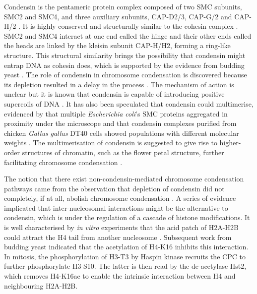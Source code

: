 Condensin is the pentameric protein complex composed of two SMC subunits, SMC2 and SMC4, and three auxiliary subunits, CAP-D2/3, CAP-G/2 and CAP-H/2 \citep{Hirano2012Condensins:Functions, Kalitsis2017CondensinGenome}. It is highly conserved and structurally similar to the cohesin complex \citep{Davidson2021GenomeComplexes}. SMC2 and SMC4 interact at one end called the hinge and their other ends called the heads are linked by the kleisin subunit CAP-H/H2, forming a ring-like structure. This structural similarity brings the possibility that condensin might entrap DNA as cohesin does, which is supported by the evidence from budding yeast \citep{Cuylen2011CondensinLinks, Ganji2018Real-timeCondensin}. The role of condensin in chromosome condensation is discovered because its depletion resulted in a delay in the process \citep{Hagstrom2002C.Meiosis, Kaitna2002TheMeiosis, Hudson2003CondensinChromosomes}. The mechanism of action is unclear but it is known that condensin is capable of introducing positive supercoils of DNA \citep{Hirano2012Condensins:Functions}. It has also been speculated that condensin could multimerise, evidenced by that multiple \textit{Escherichia coli}'s SMC proteins aggregated in proximity under the microscope \citep{Badrinarayanan2012InProteins} and that condensin complexes purified from chicken \textit{Gallus gallus} DT40 cells showed populations with different molecular weights \citep{Barysz2015Three-dimensionalModelling}. The multimerisation of condensin is suggested to give rise to higher-order structures of chromatin, such as the flower petal structure, further facilitating chromosome condensation \citep{Piskadlo2016NovelCondensation, Kalitsis2017CondensinGenome}. 

The notion that there exist non-condensin-mediated chromosome condensation pathways came from the observation that depletion of condensin did not completely, if at all, abolish chromosome condensation \citep{Hudson1998CentromereWeights, Gerlich2006CondensinCells, Vagnarelli2006CondensinMitosisb, Kireeva2004VisualizationStructure, Hagstrom2002C.Meiosis}. A series of evidence implicated that inter-nucleosomal interactions might be the alternative to condensin, which is under the regulation of a cascade of histone modifications. It is well characterised by \textit{in vitro} experiments that the acid patch of H2A-H2B could attract the H4 tail from another nucleosome \citep{Robinson200830nmEviction, Shogren-Knaak2006HistoneInteractions}. Subsequent work from budding yeast \citep{Wilkins2014AMitosis, Kruitwagen2015a} indicated that the acetylation of H4-K16 inhibits this interaction. In mitosis, the phosphorylation of H3-T3 by Haspin kinase recruits the CPC to further phosphorylate H3-S10. The latter is then read by the de-acetylase Hst2, which removes H4-K16ac to enable the intrinsic interaction between H4 and neighbouring H2A-H2B. 

